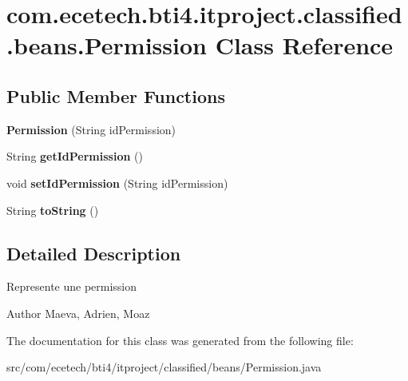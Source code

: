 \hypertarget{classcom_1_1ecetech_1_1bti4_1_1itproject_1_1classified_1_1beans_1_1_permission}{}\section{com.\+ecetech.\+bti4.\+itproject.\+classified.\+beans.\+Permission Class Reference}
\label{classcom_1_1ecetech_1_1bti4_1_1itproject_1_1classified_1_1beans_1_1_permission}
\subsection*{Public Member Functions}
\begin{DoxyCompactItemize}
\item 
{\bfseries Permission} (String id\+Permission)\hypertarget{classcom_1_1ecetech_1_1bti4_1_1itproject_1_1classified_1_1beans_1_1_permission_acb409d21056caea5fc1fd771039cce23}{}\label{classcom_1_1ecetech_1_1bti4_1_1itproject_1_1classified_1_1beans_1_1_permission_acb409d21056caea5fc1fd771039cce23}

\item 
String {\bfseries get\+Id\+Permission} ()\hypertarget{classcom_1_1ecetech_1_1bti4_1_1itproject_1_1classified_1_1beans_1_1_permission_ac24aface7ac48c1a5ef3c96b1dbbd408}{}\label{classcom_1_1ecetech_1_1bti4_1_1itproject_1_1classified_1_1beans_1_1_permission_ac24aface7ac48c1a5ef3c96b1dbbd408}

\item 
void {\bfseries set\+Id\+Permission} (String id\+Permission)\hypertarget{classcom_1_1ecetech_1_1bti4_1_1itproject_1_1classified_1_1beans_1_1_permission_ae529799454f0cabb0a009797f00d51ea}{}\label{classcom_1_1ecetech_1_1bti4_1_1itproject_1_1classified_1_1beans_1_1_permission_ae529799454f0cabb0a009797f00d51ea}

\item 
String {\bfseries to\+String} ()\hypertarget{classcom_1_1ecetech_1_1bti4_1_1itproject_1_1classified_1_1beans_1_1_permission_aaf7ca3e8fc6870fa55458e6a902b23b0}{}\label{classcom_1_1ecetech_1_1bti4_1_1itproject_1_1classified_1_1beans_1_1_permission_aaf7ca3e8fc6870fa55458e6a902b23b0}

\end{DoxyCompactItemize}


\subsection{Detailed Description}
Represente une permission \begin{DoxyAuthor}{Author}
Maeva, Adrien, Moaz 
\end{DoxyAuthor}


The documentation for this class was generated from the following file\+:\begin{DoxyCompactItemize}
\item 
src/com/ecetech/bti4/itproject/classified/beans/Permission.\+java\end{DoxyCompactItemize}
